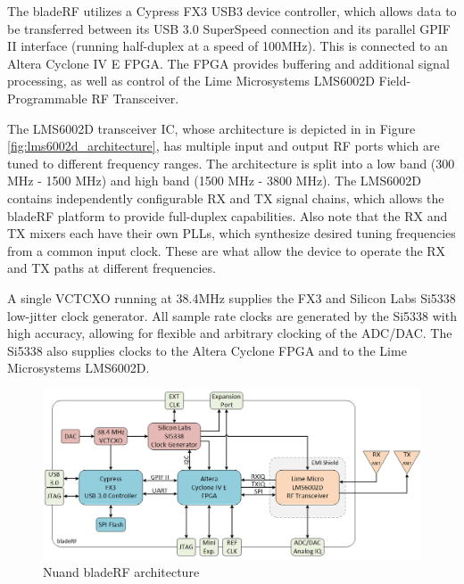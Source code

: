The bladeRF utilizes a Cypress FX3 USB3 device controller, which allows data to
be transferred between its USB 3.0 SuperSpeed connection and its parallel GPIF II
interface (running half-duplex at a speed of 100MHz). This is connected to an
Altera Cyclone IV E \ac{FPGA}. The \ac{FPGA} provides buffering and additional
signal processing, as well as control of the Lime Microsystems LMS6002D
Field-Programmable RF Transceiver.

The LMS6002D transceiver IC, whose architecture is depicted in in Figure
\ref{fig:lms6002d_architecture}, has multiple input and output RF ports
which are tuned to different frequency ranges.  The architecture is split into
a low band (300 MHz - 1500 MHz) and high band (1500 MHz - 3800 MHz). The LMS6002D contains
independently configurable RX and TX signal chains, which allows the bladeRF platform
to provide full-duplex capabilities. Also note that the RX and TX mixers each
have their own PLLs, which synthesize desired tuning frequencies from a
common input clock. These are what allow the device to operate the RX and TX
paths at different frequencies.

A single VCTCXO running at 38.4MHz supplies the FX3 and Silicon Labs Si5338
low-jitter clock generator.  All sample rate clocks are generated by the Si5338 with high
accuracy, allowing for flexible and arbitrary clocking of the ADC/DAC. The Si5338 also
supplies clocks to the Altera Cyclone \ac{FPGA} and to the Lime Microsystems LMS6002D.

\begin{figure}[H]
  \centering
  \includegraphics[width=6.5in]{images/bladerf_block_diagram.png}
  \caption{Nuand bladeRF architecture}
  \label{fig:bladerf_architecture}
\end{figure}

